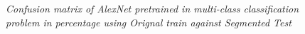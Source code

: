 \begin{figure}[H]
	\begin{center}
	\end{center}
	\caption{\textit{Confusion matrix of AlexNet pretrained in multi-class classification problem in percentage using Orignal train against Segmented Test}}
	\label{fig:add2}
\end{figure}